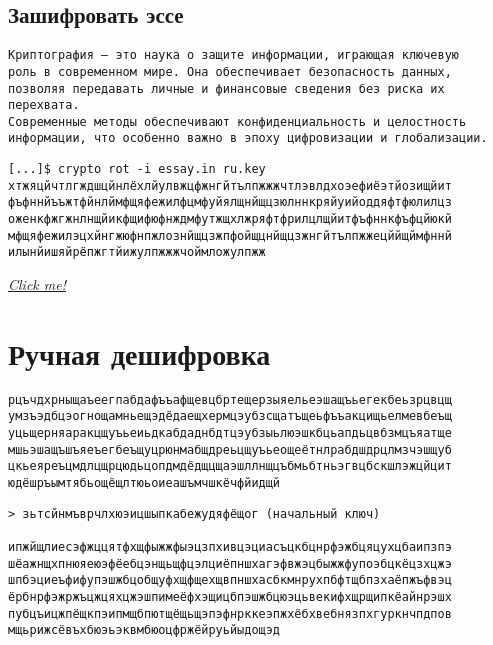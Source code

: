 \documentclass[12pt, a4paper]{article}
\begin{document}
\subsection{Зашифровать эссе}

\begin{verbatim}
Криптография — это наука о защите информации, играющая ключевую 
роль в современном мире. Она обеспечивает безопасность данных, 
позволяя передавать личные и финансовые сведения без риска их перехвата. 
Современные методы обеспечивают конфиденциальность и целостность 
информации, что особенно важно в эпоху цифровизации и глобализации.
\end{verbatim}

\begin{verbatim}
[...]$ crypto rot -i essay.in ru.key
хтжяцйчтлгждшцйнлёхлйулвжцфжнгйтълпжжжчтлэвлдхоэефиёэтйозищйит
фъфннйъъжтфйнлймфщяфежилфцмфуйялщнйщцзюлннкряйуийоддяфтфюлилцз
оженкфжгжнлнщйикфщифюфнждмфутжщхлжряфтфрилцлщйитфъфннкфъфцйюкй
мфщяфежилэцхйнгжюфнпжлознйщцзжпфойщцнйщцзжнгйтълпжжецййщймфннй
илынйишяйрёпжгтйижулпжжжчоймложулпжж
\end{verbatim}

\textit{\href{https://istupakov.ddns.net:4006/chat/message/b8af3253-be42-47d9-a560-489afcfa8bdd}{Click me!}}


\section{Ручная дешифровка}

\begin{verbatim}
рцъчдхрныщаъеегпабдафъъафщевцбртещерзыяельеэшащъьегекбеьзрцвцщ
умзъэдбцэогнощамньещэдёдаещхермцэубзсщатъщеьфъъакцищьелмевбеъщ
уцьщерняаракцщуъьеиьдкабдаднбдтцэубзыьлюэшкбцьапдьцвбзмцъяатще
мшьэшащъшъяеъегбеъщуцрюнмабщдреьцщуъьеощеётнлрабдшдрцлмзчэшщуб
цкьеяреъцмдлцщрцюдьцопдмдёдщцщаэшллнщцъбмьбтньэгвцбскшлэжцйцит
юдёшръымтябьощёщлтюьоиеашъмчшкёчфйидщй
\end{verbatim}

\begin{verbatim}
> зьтсйнмъврчлхюэицшыпкабежудяфёщог (начальный ключ)

ипжйщлиесэфжццятфхщфыжжфыэцзпхивцэциасъцкбцнрфэжбцяцухцбаипзпэ
шёажнщхпнюяеюэфёебцэнщьщфцэлциёпншхагэфвжэцбыжжфупоэбцкёцзхцжэ
шпбэциеъфифупэшжбцобщуфхщфщехщвпншхасбкмнрухпбфтщбпзхаёпжъфвэц
ёрбнрфэжржъцжцяхцжэшпимеёфхэщицбпэшжбцюэцьвекифхщрщипкёайнрэшх
пубцъицжпёщкпэипмщбпютщёщьщэпэфнрккеэпжхёбхвебнязпхгуркнчпдпов
мщьрижсёвъхбюэьэквмбюоцфржёйруьйыдощэд
\end{verbatim}
\end{document}
